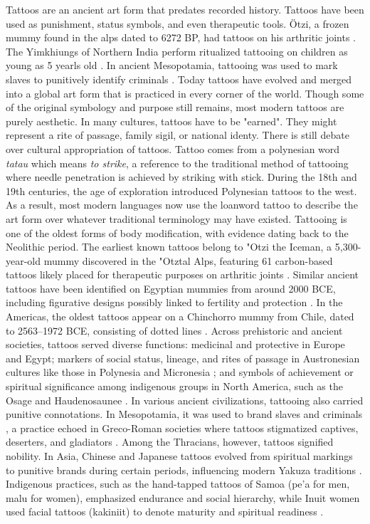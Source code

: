 \documentclass[11pt]{article}
\begin{document}
Tattoos are an ancient art form that predates recorded history.
Tattoos have been used as punishment, status symbols, and even therapeutic tools.
Ötzi, a frozen mummy found in the alps dated to 6272 BP, had tattoos on his arthritic joints \cite{deterwolf_worlds_oldest}.
The Yimkhiungs of Northern India perform ritualized tattooing on children as young as 5 yearls old \cite{kluger2015cultural}.
In ancient Mesopotamia, tattooing was used to mark slaves to punitively identify criminals \cite{hawken2022tattooing}.
Today tattoos have evolved and merged into a global art form that is practiced in every corner of the world.
Though some of the original symbology and purpose still remains, most modern tattoos are purely aesthetic.
In many cultures, tattoos have to be "earned". They might represent a rite of passage, family sigil, or national identy. There is still debate over cultural appropriation of tattoos.
Tattoo comes from a polynesian word \textit{tatau} which means \textit{to strike}, a reference to the traditional method of tattooing where needle penetration is achieved by striking with stick.
During the 18th and 19th centuries, the age of exploration introduced Polynesian tattoos to the west.
As a result, most modern languages now use the loanword tattoo to describe the art form over whatever traditional terminology may have existed.
Tattooing is one of the oldest forms of body modification, with evidence dating back to the Neolithic period. The earliest known tattoos belong to "Otzi the Iceman, a 5,300-year-old mummy discovered in the "Otztal Alps, featuring 61 carbon-based tattoos likely placed for therapeutic purposes on arthritic joints \cite{Samadelli2015,deterwolf_worlds_oldest}. Similar ancient tattoos have been identified on Egyptian mummies from around 2000 BCE, including figurative designs possibly linked to fertility and protection \cite{friedman2018natural}. In the Americas, the oldest tattoos appear on a Chinchorro mummy from Chile, dated to 2563--1972 BCE, consisting of dotted lines \cite{arrietamummies}. Across prehistoric and ancient societies, tattoos served diverse functions: medicinal and protective in Europe and Egypt; markers of social status, lineage, and rites of passage in Austronesian cultures like those in Polynesia and Micronesia \cite{kluger2015cultural}; and symbols of achievement or spiritual significance among indigenous groups in North America, such as the Osage and Haudenosaunee \cite{deterwolf2013drawing}.
In various ancient civilizations, tattooing also carried punitive connotations. In Mesopotamia, it was used to brand slaves and criminals \cite{hawken2022tattooing}, a practice echoed in Greco-Roman societies where tattoos stigmatized captives, deserters, and gladiators \cite{jones1987stigma}. Among the Thracians, however, tattoos signified nobility. In Asia, Chinese and Japanese tattoos evolved from spiritual markings to punitive brands during certain periods, influencing modern Yakuza traditions \cite{krutak2012tattooing}. Indigenous practices, such as the hand-tapped tattoos of Samoa (pe'a for men, malu for women), emphasized endurance and social hierarchy, while Inuit women used facial tattoos (kakiniit) to denote maturity and spiritual readiness \cite{johnston2017reawakening}.
\end{document}
